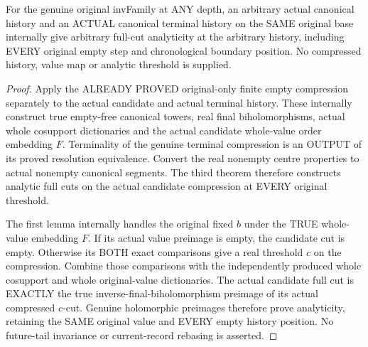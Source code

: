 \begin{theorem}
\label{hir:original-empty-history-compression-full-cut-analytic}
\leanok
For the genuine original invFamily at ANY depth, an arbitrary actual canonical
history and an ACTUAL canonical terminal history on the SAME original base
internally give arbitrary full-cut analyticity at the arbitrary history,
including EVERY original empty step and chronological boundary position.
No compressed history, value map or analytic threshold is supplied.
\end{theorem}
\begin{proof}
Apply the ALREADY PROVED original-only finite empty compression separately
to the actual candidate and actual terminal history. These internally
construct true empty-free canonical towers, real final biholomorphisms,
actual whole cosupport dictionaries and the actual candidate whole-value
order embedding $F$. Terminality of the genuine terminal compression is
an OUTPUT of its proved resolution equivalence. Convert the real nonempty
centre properties to actual nonempty canonical segments. The third theorem
therefore constructs analytic full cuts on the actual candidate compression
at EVERY original threshold.

The first lemma internally handles the original fixed $b$ under the TRUE
whole-value embedding $F$. If its actual value preimage is empty, the candidate
cut is empty. Otherwise its BOTH exact comparisons give a real threshold
$c$ on the compression. Combine those comparisons with the independently
produced whole cosupport and whole original-value dictionaries. The actual
candidate full cut is EXACTLY the true inverse-final-biholomorphism preimage
of its actual compressed $c$-cut. Genuine holomorphic preimages therefore
prove analyticity, retaining the SAME original value and EVERY empty history
position. No future-tail invariance or current-record rebasing is asserted.
\end{proof}

